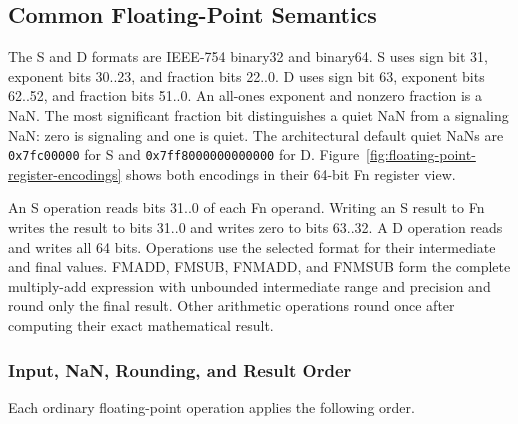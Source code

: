 \subsection{Common Floating-Point Semantics}

The S and D formats are IEEE-754 binary32 and binary64. S uses sign bit 31, exponent bits 30..23, and fraction bits
22..0. D uses sign bit 63, exponent bits 62..52, and fraction bits 51..0. An all-ones exponent and nonzero fraction
is a NaN. The most significant fraction bit distinguishes a quiet NaN from a signaling NaN: zero is signaling and
one is quiet. The architectural default quiet NaNs are \texttt{0x7fc00000} for S and
\texttt{0x7ff8000000000000} for D. Figure~\ref{fig:floating-point-register-encodings} shows both encodings in their
64-bit Fn register view.

An S operation reads bits 31..0 of each Fn operand. Writing an S result to Fn writes the result to bits 31..0 and
writes zero to bits 63..32. A D operation reads and writes all 64 bits. Operations use the selected format for their
intermediate and final values. FMADD, FMSUB, FNMADD, and FNMSUB form the complete multiply-add expression with
unbounded intermediate range and precision and round only the final result. Other arithmetic operations round once
after computing their exact mathematical result.

\subsubsection{Input, NaN, Rounding, and Result Order}

Each ordinary floating-point operation applies the following order.

